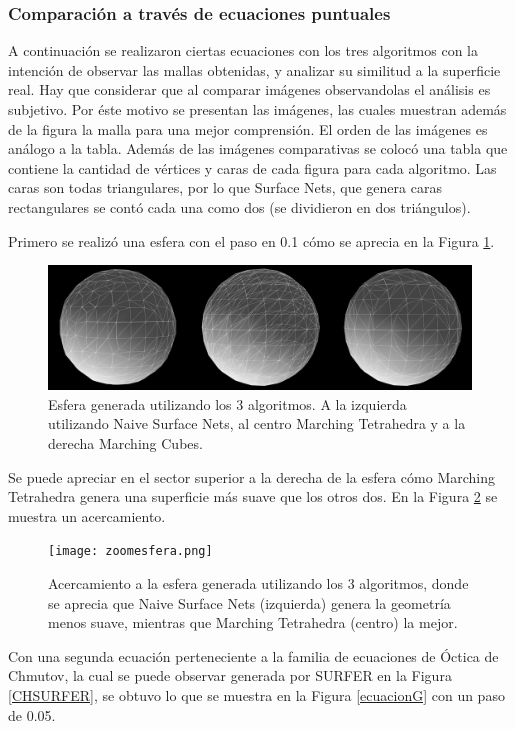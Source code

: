 \documentclass[12pt]{article}
\begin{document}
\subsubsection{Comparación a través de ecuaciones puntuales}
\noindent A continuación se realizaron ciertas ecuaciones con los tres algoritmos con la intención de observar las mallas obtenidas, y analizar su similitud a la superficie real. Hay que considerar que al comparar imágenes observandolas el análisis es subjetivo. Por éste motivo se presentan las imágenes, las cuales muestran además de la figura la malla para una mejor comprensión. El orden de las imágenes es análogo a la tabla. Además de las imágenes comparativas se colocó una tabla que contiene la cantidad de vértices y caras de cada figura para cada algoritmo. Las caras son todas triangulares, por lo que Surface Nets, que genera caras rectangulares se contó cada una como dos (se dividieron en dos triángulos).

Primero se realizó una esfera con el paso en 0.1 cómo se aprecia en la Figura \ref{esf1g}.

\begin{figure}[h!]
\includegraphics[width=\linewidth,center]{compec1.png}
\caption{Esfera generada utilizando los 3 algoritmos. A la izquierda utilizando Naive Surface Nets, al centro Marching Tetrahedra y a la derecha Marching Cubes.}
  \label{esf1g}
\end{figure}

Se puede apreciar en el sector superior a la derecha de la esfera cómo Marching Tetrahedra genera una superficie más suave que los otros dos. En la Figura \ref{acercamientoEsf} se muestra un acercamiento.

\begin{figure}[h!]
\texttt{[image: zoomesfera.png]}
\caption{Acercamiento a la esfera generada utilizando los 3 algoritmos, donde se aprecia que Naive Surface Nets (izquierda) genera la geometría menos suave, mientras que Marching Tetrahedra (centro) la mejor.}
\label{acercamientoEsf}
\end{figure}

Con una segunda ecuación perteneciente a la familia de ecuaciones de Óctica de Chmutov, la cual se puede observar generada por SURFER en la Figura \ref{CHSURFER}, se obtuvo lo que se muestra en la Figura \ref{ecuacionG} con un paso de 0.05.
\end{document}

